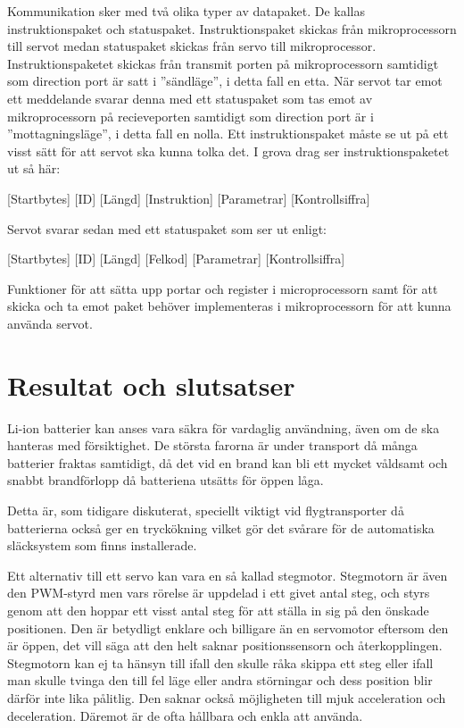 \documentclass[a4paper,12pt]{article}
\begin{document}
Kommunikation sker med två olika typer av datapaket. De kallas instruktionspaket och statuspaket. Instruktionspaket skickas från mikroprocessorn till servot medan statuspaket skickas från servo till mikroprocessor. Instruktionspaketet skickas från transmit porten på mikroprocessorn samtidigt som direction port är satt i ''sändläge'', i detta fall en etta. När servot tar emot ett meddelande svarar denna med ett statuspaket som tas emot av mikroprocessorn på recieveporten samtidigt som direction port är i ''mottagningsläge'', i detta fall en nolla. Ett instruktionspaket måste se ut på ett visst sätt för att servot ska kunna tolka det. I grova drag ser instruktionspaketet ut så här:

[Startbytes] [ID] [Längd] [Instruktion] [Parametrar] [Kontrollsiffra]

Servot svarar sedan med ett statuspaket som ser ut enligt:

[Startbytes] [ID] [Längd] [Felkod] [Parametrar] [Kontrollsiffra]

Funktioner för att sätta upp portar och register i microprocessorn samt för att skicka och ta emot paket behöver implementeras i mikroprocessorn för att kunna använda servot. 

\section{Resultat och slutsatser}
Li-ion batterier kan anses vara säkra för vardaglig användning, även om de ska hanteras med försiktighet. De största farorna är under transport då många batterier fraktas samtidigt, då det vid en brand kan bli ett mycket våldsamt och snabbt brandförlopp då batteriena utsätts för öppen låga.

Detta är, som tidigare diskuterat, speciellt viktigt vid flygtransporter då batterierna också ger en tryckökning vilket gör det svårare för de automatiska släcksystem som finns installerade.

Ett alternativ till ett servo kan vara en så kallad stegmotor. Stegmotorn är även den PWM-styrd men vars rörelse är uppdelad i ett givet antal steg, och styrs genom att den hoppar ett visst antal steg för att ställa in sig på den önskade positionen. Den är betydligt enklare och billigare än en servomotor eftersom den är öppen, det vill säga att den helt saknar positionssensorn och återkopplingen. Stegmotorn kan ej ta hänsyn till ifall den skulle råka skippa ett steg eller ifall man skulle tvinga den till fel läge eller andra störningar och dess position blir därför inte lika pålitlig. Den saknar också möjligheten till mjuk acceleration och deceleration. Däremot är de ofta hållbara och enkla att använda.
\end{document}
